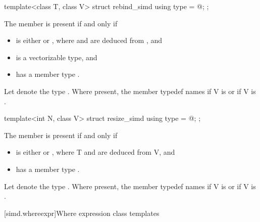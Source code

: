 \begin{itemdecl}
template<class T, class V> struct rebind_simd { using type = @\seebelow@; };
\end{itemdecl}

\begin{itemdescr}
  \pnum
  The member  is present if and only if
  \begin{itemize}
    \item {} is either  or , where  and  are deduced from , and
    \item {} is a vectorizable type, and
    \item {} has a member type .
  \end{itemize}

  \pnum
  Let  denote the type .
  Where present, the member typedef  names
   if \tcode V is  or
   if \tcode V is .
\end{itemdescr}

\begin{itemdecl}
template<int N, class V> struct resize_simd { using type = @\seebelow@; };
\end{itemdecl}

\begin{itemdescr}
  \pnum
  The member  is present if and only if
  \begin{itemize}
    \item {} is either  or , where \tcode T and  are deduced from \tcode V, and
    \item {} has a member type .
  \end{itemize}

  \pnum
  Let  denote the type .
  Where present, the member typedef  names  if \tcode V is  or  if \tcode V is .
\end{itemdescr}

[simd.whereexpr]{Where expression class templates}

